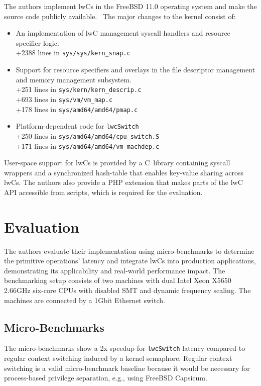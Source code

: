 \documentclass[10pt,twocolumn,a4paper]{article}
\begin{document}
The authors implement lwCs in the FreeBSD 11.0 operating system and make the source code publicly available.~\cite{lwckernelrepo,lwclibsrepo} %
The major changes to the kernel consist of:
\begin{itemize}[nosep]
  \item An implementation of lwC management syscall handlers and resource specifier logic.\\
  +2388 lines in \texttt{sys/sys/kern\_snap.c}
  \item Support for resource specifiers and overlays in the file descriptor management and memory management subsystem.\\
  +251 lines in \texttt{sys/kern/kern\_descrip.c}\\
  +693 lines in \texttt{sys/vm/vm\_map.c}\\
  +178 lines in \texttt{sys/amd64/amd64/pmap.c}
  \item Platform-dependent code for \lstinline{lwcSwitch}\\
  +250 lines in \texttt{sys/amd64/amd64/cpu\_switch.S}\\
  +171 lines in \texttt{sys/amd64/amd64/vm\_machdep.c}
\end{itemize}

User-space support for lwCs is provided by a C~library containing syscall wrappers and a synchronized hash-table that enables key-value sharing across lwCs.
The authors also provide a PHP extension that makes parts of the lwC API accessible from scripts, which is required for the evaluation.

\section{Evaluation}\label{eval}
The authors evaluate their implementation using micro-benchmarks to determine the primitive operations' latency
and integrate lwCs into production applications, demonstrating its applicability and real-world performance impact.
The benchmarking setup consists of two machines with dual Intel Xeon X5650 2.66GHz six-core CPUs with disabled SMT and dynamic frequency scaling.
The machines are connected by a 1Gbit Ethernet switch.
\cite{lwcpaper}

\subsection{Micro-Benchmarks}
The micro-benchmarks show a 2x speedup for \lstinline{lwcSwitch} latency compared to regular context switching induced by a kernel semaphore.
Regular context switching is a valid micro-benchmark baseline because it would be necessary for process-based privilege separation, e.g., using FreeBSD Capsicum.
\cite{lwcpaper}
\end{document}
